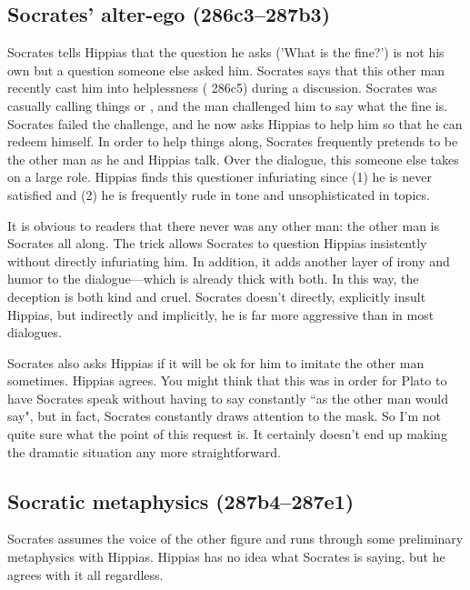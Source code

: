 \documentclass[11pt]{article}
\begin{document}
\subsection{Socrates' alter-ego (286c3--287b3)}

Socrates tells Hippias that the question he asks ('What is the fine?') is not his own but a question someone else asked him.  Socrates says that this other man recently cast him into helplessness ( 286c5) during a discussion.  Socrates was casually calling things  or , and the man challenged him to say what the fine is.  Socrates failed the challenge, and he now asks Hippias to help him so that he can redeem himself.  In order to help things along, Socrates frequently pretends to be the other man as he and Hippias talk.  Over the dialogue, this someone else takes on a large role.  Hippias finds this questioner infuriating since (1) he is never satisfied and (2) he is frequently rude in tone and unsophisticated in topics.

It is obvious to readers that there never was any other man: the other man is Socrates all along.  The trick allows Socrates to question Hippias insistently without directly infuriating him.  In addition, it adds another layer of irony and humor to the dialogue---which is already thick with both.  In this way, the deception is both kind and cruel.  Socrates doesn't directly, explicitly insult Hippias, but indirectly and implicitly, he is far more aggressive than in most dialogues.

Socrates also asks Hippias if it will be ok for him to imitate the other man sometimes.  Hippias agrees.  You might think that this was in order for Plato to have Socrates speak without having to say constantly ``as the other man would say", but in fact, Socrates constantly draws attention to the mask.  So I'm not quite sure what the point of this request is.  It certainly doesn't end up making the dramatic situation any more straightforward.


\subsection{Socratic metaphysics (287b4--287e1)}

Socrates assumes the voice of the other figure and runs through some preliminary metaphysics with Hippias.  Hippias has no idea what Socrates is saying, but he agrees with it all regardless.
\end{document}
